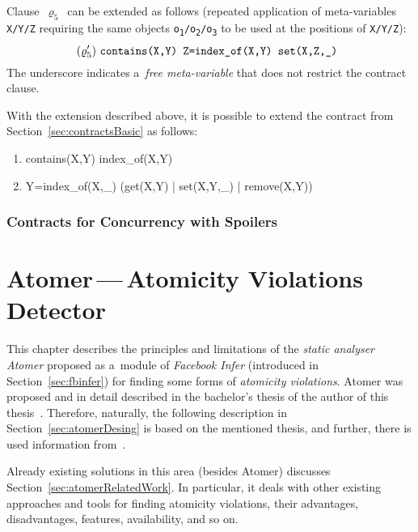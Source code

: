 Clause~$ \varrho_5 $~can be extended as follows (repeated application of
meta-variables \texttt{X/Y/Z} requiring the same objects
\texttt{o\textsubscript{1}/o\textsubscript{2}/o\textsubscript{3}} to be used
at the positions of \texttt{X/Y/Z}):
$$
    (\varrho'_5)\ \text{\texttt{%
        contains(X,Y) Z=index\_of(X,Y) set(X,Z,\_)
    }}
$$
The underscore indicates a~\emph{free meta-variable} that does not restrict
the contract clause.

With the extension described above, it is possible to extend the contract
from Section~\ref{sec:contractsBasic} as follows:
\begin{enumerate}[label={$ (\varrho'_{\arabic*}) $}]
    \tt

    \item contains(X,Y) index\_of(X,Y)
    \item Y=index\_of(X,\_) (get(X,Y) | set(X,Y,\_) | remove(X,Y))
\end{enumerate}

\subsection{Contracts for Concurrency with Spoilers}
\label{sec:contractsSpoilers}

\cite{contract}
\cite{deadlockKroening}
\cite{anaconda}



\chapter{\texorpdfstring{Atomer\,---\,Atomicity Violations Detector}{%
    Atomer - Atomicity Violations Detector%
}}
\label{chap:atomer}


This chapter describes the principles and limitations of the \emph{static
analyser} \emph{Atomer} proposed as a~module of \emph{Facebook Infer}
(introduced in Section~\ref{sec:fbinfer}) for finding some forms of
\emph{atomicity violations}. Atomer was proposed and in detail described in the
bachelor's thesis of the author of this thesis~\cite{harmimBP}. Therefore,
naturally, the following description in Section~\ref{sec:atomerDesing} is based
on the mentioned thesis, and further, there is used information
from~\cite{excel2021Harmim}.

Already existing solutions in this area (besides Atomer)
discusses Section~\ref{sec:atomerRelatedWork}. In particular, it deals with other existing
approaches and tools for finding atomicity violations, their advantages,
disadvantages, features, availability, and so on.

